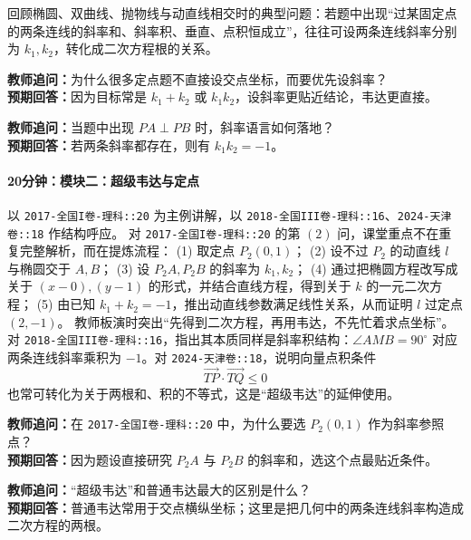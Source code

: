 \documentclass[UTF8,a4paper,11pt]{ctexart}
\begin{document}
回顾椭圆、双曲线、抛物线与动直线相交时的典型问题：若题中出现“过某固定点的两条连线的斜率和、斜率积、垂直、点积恒成立”，往往可设两条连线斜率分别为 $k_1,k_2$，转化成二次方程根的关系。

\noindent\textbf{教师追问：}为什么很多定点题不直接设交点坐标，而要优先设斜率？\\

\textbf{预期回答：}因为目标常是 $k_1+k_2$ 或 $k_1k_2$，设斜率更贴近结论，韦达更直接。\par

\noindent\textbf{教师追问：}当题中出现 $PA\perp PB$ 时，斜率语言如何落地？\\

\textbf{预期回答：}若两条斜率都存在，则有 $k_1k_2=-1$。\par

\paragraph{20分钟：模块二：超级韦达与定点}

以 \texttt{2017-全国I卷-理科::20} 为主例讲解，以 \texttt{2018-全国III卷-理科::16}、\texttt{2024-天津卷::18} 作结构呼应。
对 \texttt{2017-全国I卷-理科::20} 的第 $(2)$ 问，课堂重点不在重复完整解析，而在提炼流程：
(1) 取定点 $P_2(0,1)$；
(2) 设不过 $P_2$ 的动直线 $l$ 与椭圆交于 $A,B$；
(3) 设 $P_2A,P_2B$ 的斜率为 $k_1,k_2$；
(4) 通过把椭圆方程改写成关于 $(x-0),(y-1)$ 的形式，并结合直线方程，得到关于 $k$ 的一元二次方程；
(5) 由已知 $k_1+k_2=-1$，推出动直线参数满足线性关系，从而证明 $l$ 过定点 $(2,-1)$。
教师板演时突出“先得到二次方程，再用韦达，不先忙着求点坐标”。
对 \texttt{2018-全国III卷-理科::16}，指出其本质同样是斜率积结构：$\angle AMB=90^\circ$ 对应两条连线斜率乘积为 $-1$。对 \texttt{2024-天津卷::18}，说明向量点积条件
\[
\overrightarrow{TP}\cdot\overrightarrow{TQ}\le 0
\]
也常可转化为关于两根和、积的不等式，这是“超级韦达”的延伸使用。

\noindent\textbf{教师追问：}在 \texttt{2017-全国I卷-理科::20} 中，为什么要选 $P_2(0,1)$ 作为斜率参照点？\\

\textbf{预期回答：}因为题设直接研究 $P_2A$ 与 $P_2B$ 的斜率和，选这个点最贴近条件。\par

\noindent\textbf{教师追问：}“超级韦达”和普通韦达最大的区别是什么？\\

\textbf{预期回答：}普通韦达常用于交点横纵坐标；这里是把几何中的两条连线斜率构造成二次方程的两根。\par
\end{document}
